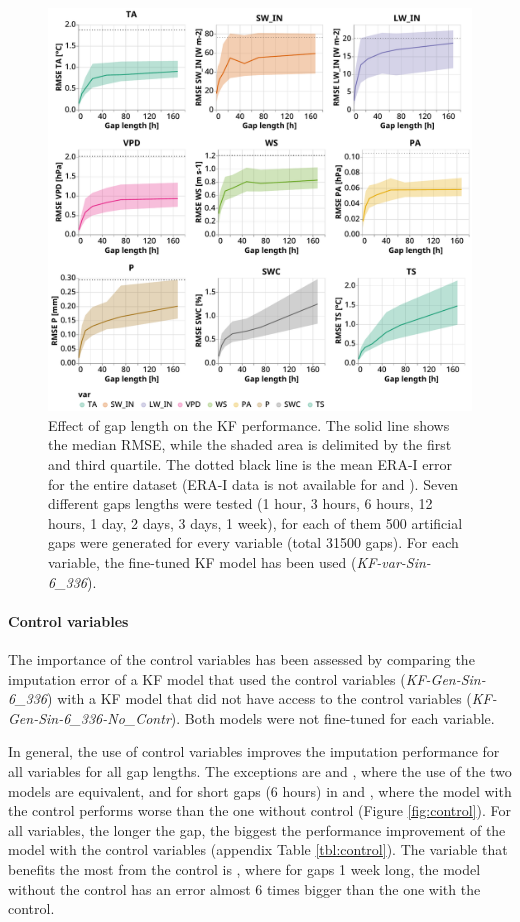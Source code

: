 \documentclass{article}
\newcommand{\imgwidth}{6in}
\begin{document}
\begin{figure}
\centerline{\includegraphics[width=\imgwidth]{gap_len}}
\caption{Effect of gap length on the KF performance. The solid line shows the median RMSE, while the shaded area is delimited by the first and third quartile. The dotted black line is the mean ERA-I error for the entire dataset (ERA-I data is not available for  and ). Seven different gaps lengths were tested (1 hour, 3 hours, 6 hours, 12 hours, 1 day, 2 days, 3 days, 1 week), for each of them 500 artificial gaps were generated for every variable (total 31500 gaps). For each variable, the fine-tuned KF model has been used (\textit{KF-\textlangle var\textrangle-Sin-6\_336}).}
\label{fig:gap_len}
\end{figure}

\paragraph{Control variables}

The importance of the control variables has been assessed by comparing the imputation error of a KF model that used the control variables (\textit{KF-Gen-Sin-6\_336}) with a KF model that did not have access to the control variables (\textit{KF-Gen-Sin-6\_336-No\_Contr}). Both models were not fine-tuned for each variable.

In general, the use of control variables improves the imputation performance for all variables for all gap lengths. The exceptions are  and , where the use of the two models are equivalent, and for short gaps (6 hours) in  and , where the model with the control performs worse than the one without control (Figure \ref{fig:control}).
For all variables, the longer the gap, the biggest the performance improvement of the model with the control variables (appendix Table \ref{tbl:control}).
The variable that benefits the most from the control is , where for gaps 1 week long, the model without the control has an error almost 6 times bigger than the one with the control.
\end{document}
